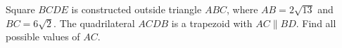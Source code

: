 Square $BCDE$ is constructed outside triangle $ABC$, where $AB=2\sqrt{13}$ and $BC=6\sqrt2$. The quadrilateral $ACDB$ is a trapezoid with $AC\parallel BD$. Find all possible values of $AC$.
